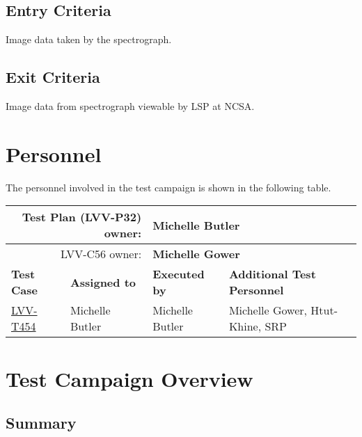 \documentclass[DM,lsstdraft,STR,toc]{lsstdoc}
\begin{document}
  \subsection{Entry Criteria}
  Image data taken by the spectrograph. ~


  \subsection{Exit Criteria}
  Image data from spectrograph viewable by LSP at NCSA.~



\newpage
\section{Personnel}
\label{sect:personnel}

The personnel involved in the test campaign is shown in the following table.

\begin{longtable}{p{3cm}p{3cm}p{3cm}p{6cm}}
\hline
\multicolumn{2}{r}{Test Plan (LVV-P32) owner:} &
\multicolumn{2}{l}{\textbf{ Michelle Butler } }\\\hline
\multicolumn{2}{r}{ LVV-C56 owner:} &
\multicolumn{2}{l}{\textbf{
    Michelle Gower
}
} \\\hline
\textbf{Test Case} & \textbf{Assigned to} & \textbf{Executed by} & \textbf{Additional Test Personnel} \\ \hline
\href{https://jira.lsstcorp.org/secure/Tests.jspa#/testCase/LVV-T454}{LVV-T454}
& {\small Michelle Butler } & {\small Michelle Butler } &
\begin{minipage}[]{6cm}
\smallskip
{\small Michelle Gower, Htut-Khine, SRP
 }
\medskip
\end{minipage}
\\ \hline
\end{longtable}

\newpage

\section{Test Campaign Overview}
\label{sect:overview}

\subsection{Summary}
\label{sect:summarytable}
\end{document}
